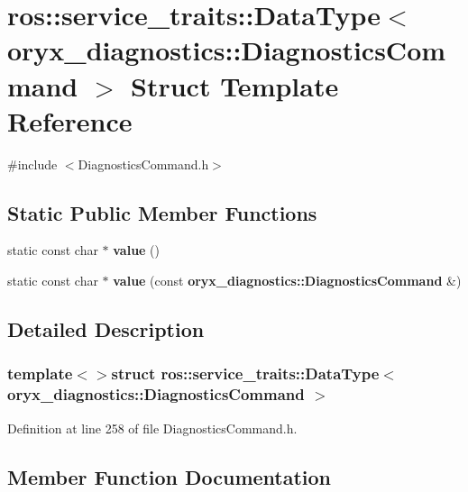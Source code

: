 \section{ros\-:\-:service\-\_\-traits\-:\-:\-Data\-Type$<$ oryx\-\_\-diagnostics\-:\-:\-Diagnostics\-Command $>$ \-Struct \-Template \-Reference}
\label{structros_1_1service__traits_1_1DataType_3_01oryx__diagnostics_1_1DiagnosticsCommand_01_4}


{\ttfamily \#include $<$\-Diagnostics\-Command.\-h$>$}

\subsection*{\-Static \-Public \-Member \-Functions}
\begin{DoxyCompactItemize}
\item 
static const char $\ast$ {\bf value} ()
\item 
static const char $\ast$ {\bf value} (const {\bf oryx\-\_\-diagnostics\-::\-Diagnostics\-Command} \&)
\end{DoxyCompactItemize}


\subsection{\-Detailed \-Description}
\subsubsection*{template$<$$>$struct ros\-::service\-\_\-traits\-::\-Data\-Type$<$ oryx\-\_\-diagnostics\-::\-Diagnostics\-Command $>$}



\-Definition at line 258 of file \-Diagnostics\-Command.\-h.



\subsection{\-Member \-Function \-Documentation}
